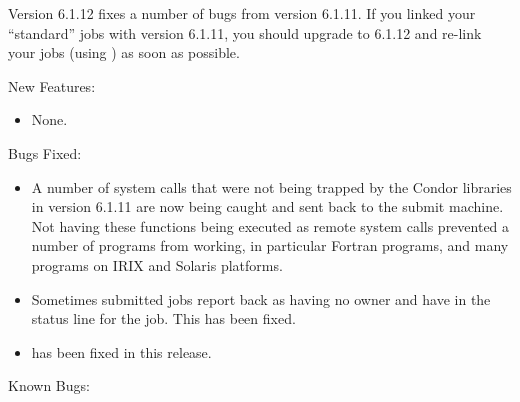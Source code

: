 Version 6.1.12 fixes a number of bugs from version 6.1.11.
If you linked your ``standard'' jobs with version 6.1.11, you should
upgrade to 6.1.12 and re-link your jobs (using ) as soon as
possible.

\noindent New Features:

\begin{itemize}

\item None.

\end{itemize}

\noindent Bugs Fixed:

\begin{itemize}

\item A number of system calls that were not being trapped by the Condor
libraries in version 6.1.11 are now being caught and sent back to the
submit machine.
Not having these functions being executed as remote system calls prevented
a number of programs from working, in particular Fortran programs, and
many programs on IRIX and Solaris platforms.

\item Sometimes submitted jobs report back as having no owner and have
 in the status line for the job. This has been fixed.

\item {}  has been fixed in this release.

\end{itemize}

\noindent Known Bugs:

